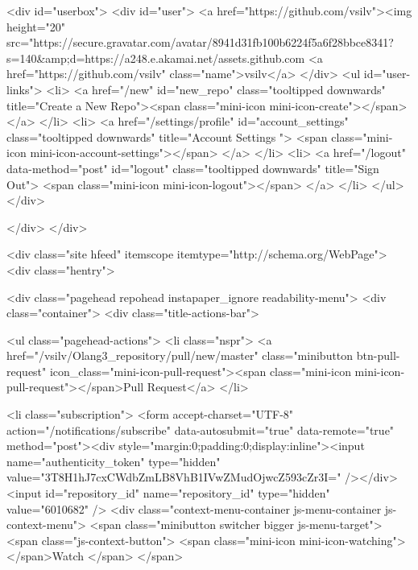             

  
  <div id="userbox">
    <div id="user">
      <a href="https://github.com/vsilv"><img height="20" src="https://secure.gravatar.com/avatar/8941d31fb100b6224f5a6f28bbce8341?s=140&amp;d=https://a248.e.akamai.net/assets.github.com%
      <a href="https://github.com/vsilv" class="name">vsilv</a>
    </div>
    <ul id="user-links">
      <li>
        <a href="/new" id="new_repo" class="tooltipped downwards" title="Create a New Repo"><span class="mini-icon mini-icon-create"></span></a>
      </li>
      <li>
        <a href="/settings/profile" id="account_settings"
          class="tooltipped downwards"
          title="Account Settings ">
          <span class="mini-icon mini-icon-account-settings"></span>
        </a>
      </li>
      <li>
          <a href="/logout" data-method="post" id="logout" class="tooltipped downwards" title="Sign Out">
            <span class="mini-icon mini-icon-logout"></span>
          </a>
      </li>
    </ul>
  </div>



          
        </div>
      </div>

      

      


            <div class="site hfeed" itemscope itemtype="http://schema.org/WebPage">
      <div class="hentry">
        
        <div class="pagehead repohead instapaper_ignore readability-menu">
          <div class="container">
            <div class="title-actions-bar">
              


                  <ul class="pagehead-actions">
          <li class="nspr">
            <a href="/vsilv/Olang3_repository/pull/new/master" class="minibutton btn-pull-request" icon_class="mini-icon-pull-request"><span class="mini-icon mini-icon-pull-request"></span>Pull Request</a>
          </li>

          <li class="subscription">
              <form accept-charset="UTF-8" action="/notifications/subscribe" data-autosubmit="true" data-remote="true" method="post"><div style="margin:0;padding:0;display:inline"><input name="authenticity_token" type="hidden" value="3T8H1hJ7cxCWdbZmLB8VhB1IVwZMudOjwcZ593cZr3I=" /></div>  <input id="repository_id" name="repository_id" type="hidden" value="6010682" />
  <div class="context-menu-container js-menu-container js-context-menu">
    <span class="minibutton switcher bigger js-menu-target">
      <span class="js-context-button">
          <span class="mini-icon mini-icon-watching"></span>Watch
      </span>
    </span>

